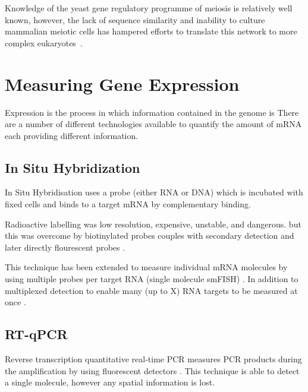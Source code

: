
Knowledge of the yeast gene regulatory programme of meiosis is relatively well known, however, the lack of sequence similarity and inability to culture mammalian meiotic cells has hampered efforts to translate this network to more complex eukaryotes~\cite{Brar2011HighResolution,Mata2002transcriptional,Chu1998Transcriptional,Handel2010Genetics}.



\section{Measuring Gene Expression}

Expression is the process in which information contained in the genome is 
There are a number of different technologies available to quantify the amount of mRNA each providing different information.

\subsection{In Situ Hybridization}
In Situ Hybridisation uses a probe (either RNA or DNA) which is incubated with fixed cells and binds to a target mRNA by complementary binding. 

Radioactive labelling was low resolution, expensive, unstable, and dangerous. but this was overcome by biotinylated probes couples with secondary detection \parencite{Singer1982Actin} and later directly flourescent probes \parencite{Kislauskis1993Isoformspecific}.

This technique has been extended to measure individual mRNA molecules by using multiple probes per target RNA (single molecule smFISH) \parencite{Raj2008Imaging, Femino1998Visualization}. In addition to multiplexed detection to enable many (up to X) RNA targets to be measured at once \parencite{}.


\subsection{RT-qPCR}
Reverse transcription quantitative real-time PCR measures PCR products during the amplification by using fluorescent detectors \parencite{Gibson1996novel, Heid1996Real, Chiang1996Use}. This technique is able to detect a single molecule, however any spatial information is lost.

